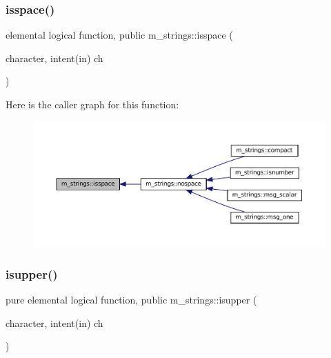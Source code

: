 \mbox{\label{namespacem__strings_ab32380c29451e56395153155c1632d74}} 
\subsubsection{\texorpdfstring{isspace()}{isspace()}}
{\footnotesize\ttfamily elemental logical function, public m\+\_\+strings\+::isspace (\begin{DoxyParamCaption}\item[{character, intent(in)}]{ch }\end{DoxyParamCaption})}

Here is the caller graph for this function\+:\nopagebreak
\begin{figure}[H]
\begin{center}
\leavevmode
\includegraphics[width=350pt]{namespacem__strings_ab32380c29451e56395153155c1632d74_icgraph}
\end{center}
\end{figure}
\mbox{\label{namespacem__strings_ac98536a1b69026cd5373dfff489f7733}} 
\subsubsection{\texorpdfstring{isupper()}{isupper()}}
{\footnotesize\ttfamily pure elemental logical function, public m\+\_\+strings\+::isupper (\begin{DoxyParamCaption}\item[{character, intent(in)}]{ch }\end{DoxyParamCaption})}

\mbox{\label{namespacem__strings_a9953d1e400bedceab6a06910c6cdf208}} 
